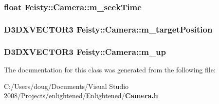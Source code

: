 \subsubsection[{m\_\-seekTime}]{\setlength{\rightskip}{0pt plus 5cm}float {\bf Feisty::Camera::m\_\-seekTime}\hspace{0.3cm}{\ttfamily  [protected]}}\label{class_feisty_1_1_camera_a0661ea7d265ad628f56e99bc02b3c13e}
\subsubsection[{m\_\-targetPosition}]{\setlength{\rightskip}{0pt plus 5cm}D3DXVECTOR3 {\bf Feisty::Camera::m\_\-targetPosition}\hspace{0.3cm}{\ttfamily  [protected]}}\label{class_feisty_1_1_camera_a5f3611e714414283ea520b9d9850a0d0}
\subsubsection[{m\_\-up}]{\setlength{\rightskip}{0pt plus 5cm}D3DXVECTOR3 {\bf Feisty::Camera::m\_\-up}\hspace{0.3cm}{\ttfamily  [protected]}}\label{class_feisty_1_1_camera_ab3ea9c1d9553c640f59804107de305b2}


The documentation for this class was generated from the following file:\begin{DoxyCompactItemize}
\item 
C:/Users/doug/Documents/Visual Studio 2008/Projects/enlightened/Enlightened/{\bf Camera.h}\end{DoxyCompactItemize}
